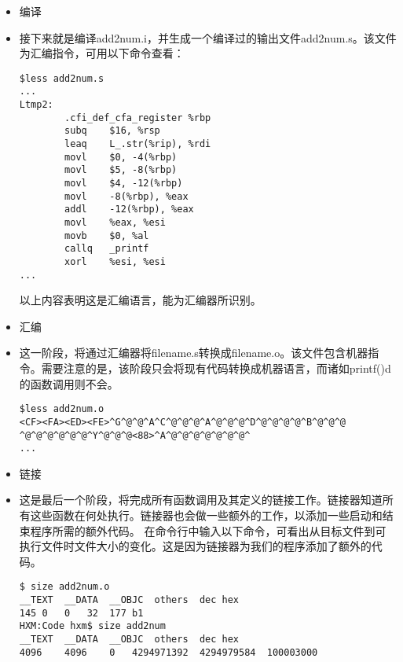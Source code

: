 \documentclass[10pt,a4paper%
tablecaptionabove]{article}
\begin{document}
\begin{CJK}{UTF8}{gkai}
\begin{itemize}
\item 编译
\item[] 接下来就是编译{\ttfamily add2num.i}，并生成一个编译过的输出文件{\ttfamily add2num.s}。该文件为汇编指令，可用以下命令查看：
\begin{lstlisting}[backgroundcolor=\color{red!10}]
$less add2num.s
...
Ltmp2:
        .cfi_def_cfa_register %rbp
        subq    $16, %rsp
        leaq    L_.str(%rip), %rdi
        movl    $0, -4(%rbp)
        movl    $5, -8(%rbp)
        movl    $4, -12(%rbp)
        movl    -8(%rbp), %eax
        addl    -12(%rbp), %eax
        movl    %eax, %esi
        movb    $0, %al
        callq   _printf
        xorl    %esi, %esi
...      
\end{lstlisting}
以上内容表明这是汇编语言，能为汇编器所识别。
\item 汇编
\item[] 这一阶段，将通过汇编器将{\ttfamily filename.s}转换成{\ttfamily filename.o}。该文件包含机器指令。需要注意的是，该阶段只会将现有代码转换成机器语言，而诸如{\ttfamily printf()}d的函数调用则不会。
\begin{lstlisting}[backgroundcolor=\color{red!10}]
$less add2num.o
<CF><FA><ED><FE>^G^@^@^A^C^@^@^@^A^@^@^@^D^@^@^@^@^B^@^@^@ ^@^@^@^@^@^@^Y^@^@^@<88>^A^@^@^@^@^@^@^@^
...      
\end{lstlisting}
\item 链接
\item[] 
这是最后一个阶段，将完成所有函数调用及其定义的链接工作。链接器知道所有这些函数在何处执行。链接器也会做一些额外的工作，以添加一些启动和结束程序所需的额外代码。 在命令行中输入以下命令，可看出从目标文件到可执行文件时文件大小的变化。这是因为链接器为我们的程序添加了额外的代码。
\begin{lstlisting}[backgroundcolor=\color{red!10}]
$ size add2num.o
__TEXT	__DATA	__OBJC	others	dec	hex
145	0	0	32	177	b1	
HXM:Code hxm$ size add2num
__TEXT	__DATA	__OBJC	others	dec	hex
4096	4096	0	4294971392	4294979584	100003000
\end{lstlisting}
\end{itemize}

\end{CJK}
\end{document}
